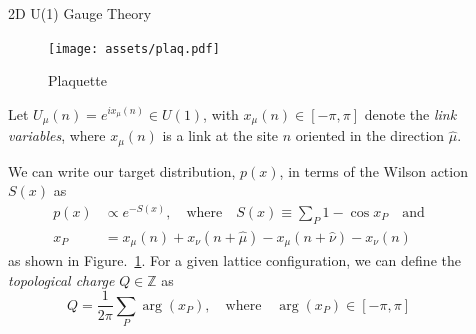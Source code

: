 \documentclass[final]{beamer}
\newlength{\sepwidth}
\newlength{\colwidth}
\newcommand{\separatorcolumn}{\begin{column}{\sepwidth}\end{column}}
\begin{document}
\begin{frame}[t]
\begin{columns}[t]
\begin{column}{\colwidth}
\end{column}

\separatorcolumn

\begin{column}{\colwidth}
  \begin{block}{2D U(1) Gauge Theory}
    \begin{figure}
      \texttt{[image: assets/plaq.pdf]}
      \caption{\label{fig:plaquette}Plaquette}%
    \end{figure}
    Let \(U_{\mu}(n) = e^{i x_{\mu}(n)} \in U(1)\), with \(x_{\mu}(n) \in \left[-\pi, \pi\right]\) denote the \emph{link
    variables}, where \(x_{\mu}(n)\) is a link at the site \(n\) oriented in the direction \(\hat\mu\).

    We can write our target distribution, \(p(x)\), in terms of the Wilson action \(S(x)\) as
    \begin{align}
      p(x)&\propto e^{- S(x)}, \quad \text{where}\quad S(x) \equiv \sum_{P} 1 - \cos x_{P}\quad\text{and}\\
      x_{P} &= x_{\mu}(n) + x_{\nu}(n+\hat{\mu})-x_{\mu}(n+\hat{\nu}) - x_{\nu}(n)
    \end{align}
    as shown in Figure.~\ref{fig:plaquette}.
    For a given lattice configuration, we can define the \emph{topological charge} \(Q \in \mathbb{Z}\) as
    \begin{equation}
      Q = \frac{1}{2\pi}\sum_{P} \arg(x_{P}), \quad\text{where}\quad \arg(x_{P}) \in [-\pi,\pi]
    \end{equation}
  \end{block}


\end{column}
\end{columns}
\end{frame}
\end{document}
